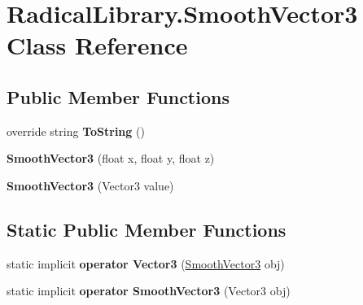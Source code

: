 \hypertarget{class_radical_library_1_1_smooth_vector3}{}\section{Radical\+Library.\+Smooth\+Vector3 Class Reference}
\label{class_radical_library_1_1_smooth_vector3}
\subsection*{Public Member Functions}
\begin{DoxyCompactItemize}
\item 
\mbox{\label{class_radical_library_1_1_smooth_vector3_ad0c65a7f1c1ee33822d7be53a02beb23}} 
override string {\bfseries To\+String} ()
\item 
\mbox{\label{class_radical_library_1_1_smooth_vector3_a3873c455a7e39149ad1b54b1ca6b94f3}} 
{\bfseries Smooth\+Vector3} (float x, float y, float z)
\item 
\mbox{\label{class_radical_library_1_1_smooth_vector3_ad98d9c92c28dbec533b3e6dfe95bc2f7}} 
{\bfseries Smooth\+Vector3} (Vector3 value)
\end{DoxyCompactItemize}
\subsection*{Static Public Member Functions}
\begin{DoxyCompactItemize}
\item 
\mbox{\label{class_radical_library_1_1_smooth_vector3_a988fe9c1a29aa3ff9780f0df95b93c5b}} 
static implicit {\bfseries operator Vector3} (\hyperlink{class_radical_library_1_1_smooth_vector3}{Smooth\+Vector3} obj)
\item 
\mbox{\label{class_radical_library_1_1_smooth_vector3_a2483e5c896cdd26188d13554cc7c5078}} 
static implicit {\bfseries operator Smooth\+Vector3} (Vector3 obj)
\end{DoxyCompactItemize}
